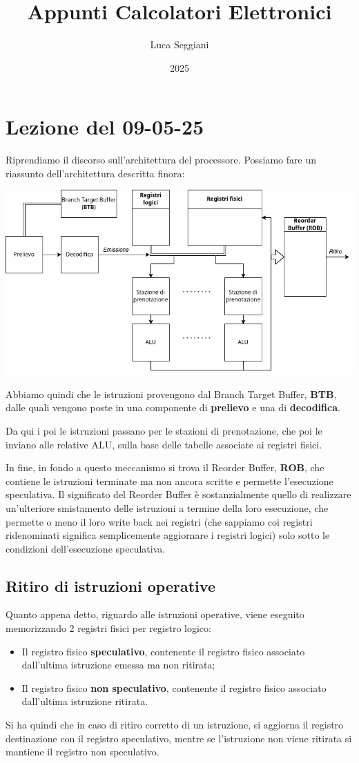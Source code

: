 \documentclass[a4paper,11pt]{article}
\title{Appunti Calcolatori Elettronici}
\author{Luca Seggiani}
\date{2025}
\begin{document}
\section{Lezione del 09-05-25}

\thispagestyle{empty}
\pagestyle{fancy}

Riprendiamo il discorso sull'architettura del processore.
Possiamo fare un riassunto dell'architettura descritta finora:
\begin{center}
	\includegraphics[scale=.55]{../figures/arch1.png}
\end{center}

Abbiamo quindi che le istruzioni provengono dal Branch Target Buffer, \textbf{BTB}, dalle quali vengono poste in una componente di \textbf{prelievo} e una di \textbf{decodifica}.

Da qui i poi le istruzioni passano per le stazioni di prenotazione, che poi le inviano alle relative ALU, sulla base delle tabelle associate ai registri fisici.

In fine, in fondo a questo meccanismo si trova il Reorder Buffer, \textbf{ROB}, che contiene le istruzioni terminate ma non ancora scritte e permette l'esecuzione speculativa.
Il significato del Reorder Buffer è sostanzialmente quello di realizzare un'ulteriore smistamento delle istruzioni a termine della loro esecuzione, che permette o meno il loro write back nei registri (che sappiamo coi registri ridenominati significa semplicemente aggiornare i registri logici) solo sotto le condizioni dell'esecuzione speculativa.

\subsection{Ritiro di istruzioni operative}
Quanto appena detto, riguardo alle istruzioni operative, viene eseguito memorizzando 2 registri fisici per registro logico:
\begin{itemize}
	\item Il registro fisico \textbf{speculativo}, contenente il registro fisico associato dall'ultima istruzione emessa ma non ritirata;
	\item Il registro fisico \textbf{non speculativo}, contenente il registro fisico associato dall'ultima istruzione ritirata.
\end{itemize}
Si ha quindi che in caso di ritiro corretto di un istruzione, si aggiorna il registro destinazione con il registro speculativo, mentre se l'istruzione non viene ritirata si mantiene il registro non speculativo.
\end{document}
